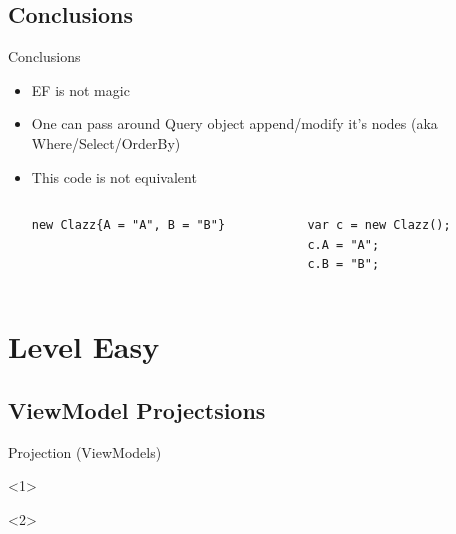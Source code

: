 \documentclass{bredelebeamer}
\begin{document}
\subsection*{Conclusions}
\begin{frame}[fragile]{Conclusions}
    \begin{itemize}
        \item<1-> EF is not magic
        \item<2-> One can pass around Query object append/modify it's nodes (aka Where/Select/OrderBy)
        \item<3-> { This code is not equivalent
        \begin{columns}
            \begin{column}{0.5\textwidth}
                \begin{lstlisting}
new Clazz{A = "A", B = "B"}
                \end{lstlisting}
            \end{column}
            \begin{column}{0.5\textwidth}
                \begin{lstlisting}
var c = new Clazz();
c.A = "A";
c.B = "B";
                \end{lstlisting}
            \end{column}
        \end{columns}
        }
    \end{itemize}
\end{frame}

\section{Level Easy}
\subsection{ViewModel Projectsions}
\begin{frame}{Projection (ViewModels)}
    \begin{onlyenv}<1>
        
    \end{onlyenv}
    \begin{onlyenv}<2>
        
    \end{onlyenv}
    
\end{frame}
\end{document}
